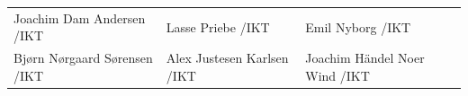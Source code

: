 \vspace{10pt}
\begin{minipage}[l]{\textwidth}
\tabulinesep=25pt
\begin{tabu} to \textwidth{X[l]X[l]X[l]}
 \makebox[\linewidth]{\hrulefill}\newline Joachim Dam Andersen     /IKT  
&\makebox[\linewidth]{\hrulefill}\newline Lasse Priebe             /IKT 
&\makebox[\linewidth]{\hrulefill}\newline Emil Nyborg              /IKT\\
 \makebox[\linewidth]{\hrulefill}\newline Bjørn Nørgaard Sørensen  /IKT  
&\makebox[\linewidth]{\hrulefill}\newline Alex Justesen Karlsen    /IKT 
&\makebox[\linewidth]{\hrulefill}\newline Joachim Händel Noer Wind /IKT
\end{tabu}
\end{minipage}